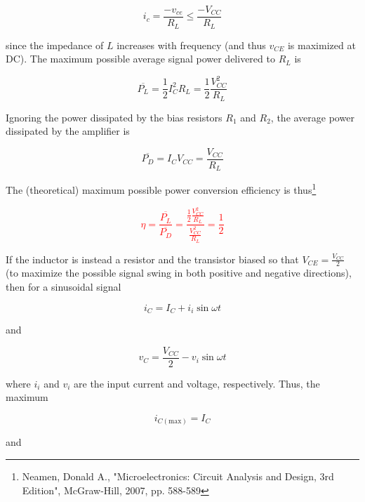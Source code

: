\begin{equation}
i_{c} = \frac{-v_{ce}}{R_{L}} \leq \frac{-V_{CC}}{R_{L}}
\end{equation}

since the impedance of $L$ increases with frequency (and thus $v_{CE}$ is maximized at DC). The maximum possible average signal power delivered to $R_{L}$ is

\begin{equation}
\overline{P_{L}} = \frac{1}{2}I_{C}^{2}R_{L} = \frac{1}{2}\frac{V_{CC}^{2}}{R_{L}}
\end{equation}

Ignoring the power dissipated by the bias resistors $R_{1}$ and $R_{2}$, the average power dissipated by the amplifier is

\begin{equation}
\overline{P_{D}} = I_{C}V_{CC} = \frac{V_{CC}}{R_{L}}
\end{equation}

The (theoretical) maximum possible power conversion efficiency is thus\footnote{Neamen, Donald A., "Microelectronics: Circuit Analysis and Design, 3rd Edition", McGraw-Hill, 2007, pp. 588-589}

\textcolor{red}{
\begin{equation}
\eta = \frac{\overline{P_{L}}}{\overline{P_{D}}} = \frac{\frac{1}{2}\frac{V_{CC}^{2}}{R_{L}}}{\frac{V_{CC}^{2}}{R_{L}}} = \frac{1}{2}
\end{equation}
}

\par
If the inductor is instead a resistor and the transistor biased so that $V_{CE} = \frac{V_{CC}}{2}$ (to maximize the possible signal swing in both positive and negative directions), then for a sinusoidal signal

\begin{equation}
i_{C} = I_{C} + i_{i}\sin{\omega t}
\end{equation}

and

\begin{equation}
v_{C} = \frac{V_{CC}}{2} - v_{i}\sin{\omega t}
\end{equation}

where $i_{i}$ and $v_{i}$ are the input current and voltage, respectively. Thus, the maximum

\begin{equation}
i_{C(\text{max})} = I_{C}
\end{equation}

and

